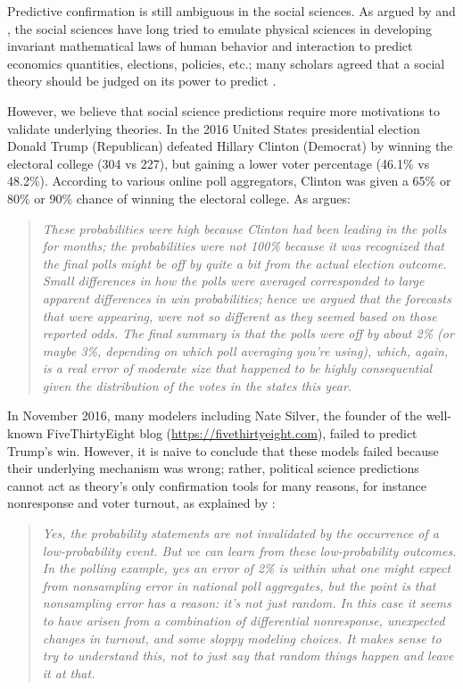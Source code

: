 \documentclass{statsoc}
\begin{document}
Predictive confirmation is still ambiguous in the social sciences. As argued by \cite{popper1944poverty, popper1945poverty} and \cite{sarewitz1999prediction}, the social sciences 
have long tried to emulate physical sciences in developing invariant mathematical laws of human behavior and interaction to predict economics quantities, elections, policies, etc.; 
many scholars agreed that a social theory should be judged on its power to predict \citep{friedman1953essays}. 

However, we believe that social science predictions require more motivations to validate underlying theories. In the 2016 United States presidential election   Donald Trump (Republican) defeated   Hillary Clinton (Democrat) by winning the electoral college (304 vs 227), but gaining a lower voter percentage (46.1\% vs 48.2\%). According to various online poll aggregators, Clinton was given a 65\% or 80\% or 90\% chance of winning the electoral college.  As \cite{gelman2016elections} argues:

\begin{quote}
\emph{
 These probabilities were high because Clinton had been leading in the polls for months; the probabilities were not 100\% because it was recognized that the final polls might be off by quite a bit from the actual election outcome. Small differences in how the polls were averaged corresponded to large apparent differences in win probabilities; hence we argued that the forecasts that were appearing, were not so different as they seemed based on those reported odds. The final summary is that the polls were off by about 2\% (or maybe 3\%, depending on which poll averaging you’re using), which, again, is a real error of moderate size that happened to be highly consequential given the distribution of the votes in the states this year.
 }
\end{quote}
%
In November 2016, many modelers including Nate Silver, the founder of the well-known FiveThirtyEight blog (\url{https://fivethirtyeight.com}), failed to predict Trump's win. However, it is naive to conclude that these models failed because their underlying mechanism was wrong; rather, political science predictions cannot  act as theory's only confirmation tools for many reasons, for instance nonresponse and voter turnout, as explained by \cite{gelman2016elections2}:

\begin{quote}
\emph{
Yes, the probability statements are not invalidated by the occurrence of a low-probability event. But we can learn from these low-probability outcomes. In the polling example, yes an error of 2\% is within what one might expect from nonsampling error in national poll aggregates, but the point is that nonsampling error has a reason: it’s not just random. In this case it seems to have arisen from a combination of differential nonresponse, unexpected changes in turnout, and some sloppy modeling choices. It makes sense to try to understand this, not to just say that random things happen and leave it at that.
}
\end{quote}
\end{document}
